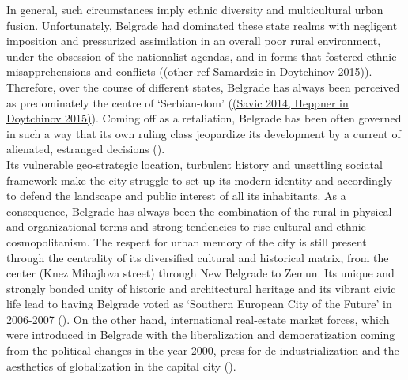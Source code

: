 \documentclass[11pt]{report}
\begin{document}
In general, such circumstances imply ethnic diversity and multicultural urban fusion.
Unfortunately, Belgrade had dominated these state realms with negligent imposition and pressurized  assimilation in an overall poor  rural  environment, under  the obsession of the nationalist agendas, and in forms  that  fostered ethnic misapprehensions  and  conflicts (\href{ref}{(other ref Samardzic in Doytchinov 2015)}).
Therefore, over the course of different states, Belgrade has always been perceived as predominately the centre of ‘Serbian-dom’ (\href{ref}{(Savic 2014, Heppner in Doytchinov 2015)}).
Coming off as a retaliation, Belgrade has been often governed in such a way that its own ruling class jeopardize its development by a current of alienated, estranged  decisions (\href{ref}{\citealt{doytchinov_belgrade_2015}}).
\\

Its vulnerable geo-strategic location, turbulent history and unsettling sociatal framework make the city struggle to set up its modern identity and accordingly to defend the landscape and public interest of all its inhabitants. As a consequence, Belgrade has always been the combination of the rural in physical and organizational terms and strong tendencies to rise cultural and ethnic cosmopolitanism.
The respect for urban memory of the city is still present through the centrality of its diversified cultural and historical matrix, from the center (Knez Mihajlova street) through New Belgrade to Zemun.
Its unique and strongly bonded unity of historic and architectural heritage and its vibrant civic life lead to having Belgrade voted as ‘Southern European City of the Future’ in 2006-2007 (\href{ref}{\citealt{hirt_belgrade_2009}}).
On the other hand, international real-estate market forces, which were introduced in Belgrade with the liberalization and democratization coming from the political changes in the year 2000, press for de-industrialization and the aesthetics of globalization in the capital city (\href{ref}{\citealt{grozdanic_belgrade_2008}}).
\\
\end{document}
